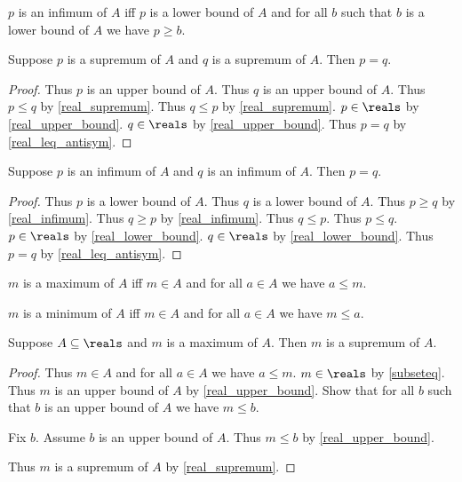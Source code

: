 \begin{definition}\label{real_infimum}
    $p$ is an infimum of $A$ iff $p$ is a lower bound of $A$ and for all $b$ such that $b$ is a lower bound of $A$ we have $p \geq b$.
\end{definition}

\begin{theorem}\label{real_supremum_unique}
    Suppose $p$ is a supremum of $A$ and $q$ is a supremum of $A$.
    Then $p = q$.
\end{theorem}
\begin{proof}
    Thus $p$ is an upper bound of $A$.
    Thus $q$ is an upper bound of $A$.
    Thus $p \leq q$ by \cref{real_supremum}.
    Thus $q \leq p$ by \cref{real_supremum}.
    $p\in\reals$ by \cref{real_upper_bound}.
    $q\in\reals$ by \cref{real_upper_bound}.
    Thus $p = q$ by \cref{real_leq_antisym}.
\end{proof}

\begin{theorem}\label{real_infimum_unique}
    Suppose $p$ is an infimum of $A$ and $q$ is an infimum of $A$.
    Then $p = q$.
\end{theorem}
\begin{proof}
    Thus $p$ is a lower bound of $A$.
    Thus $q$ is a lower bound of $A$.
    Thus $p \geq q$ by \cref{real_infimum}.
    Thus $q \geq p$ by \cref{real_infimum}.
    Thus $q \leq p$.
    Thus $p \leq q$.
    $p\in\reals$ by \cref{real_lower_bound}.
    $q\in\reals$ by \cref{real_lower_bound}.
    Thus $p = q$ by \cref{real_leq_antisym}.
\end{proof}

\begin{definition}\label{real_maximum}
    $m$ is a maximum of $A$ iff $m\in A$ and for all $a\in A$ we have $a \leq m$.
\end{definition}

\begin{definition}\label{real_minimum}
    $m$ is a minimum of $A$ iff $m\in A$ and for all $a\in A$ we have $m \leq a$.
\end{definition}

\begin{theorem}\label{real_maximum_is_supremum}
    Suppose $A\subseteq\reals$ and $m$ is a maximum of $A$.
    Then $m$ is a supremum of $A$.
\end{theorem}
\begin{proof}
    Thus $m\in A$ and for all $a\in A$ we have $a \leq m$.
    $m\in\reals$ by \cref{subseteq}.
    Thus $m$ is an upper bound of $A$ by \cref{real_upper_bound}.
    Show that for all $b$ such that $b$ is an upper bound of $A$ we have $m \leq b$.
    \begin{subproof}
        Fix $b$.
        Assume $b$ is an upper bound of $A$.
        Thus $m \leq b$ by \cref{real_upper_bound}.
    \end{subproof}
    Thus $m$ is a supremum of $A$ by \cref{real_supremum}.
\end{proof}

